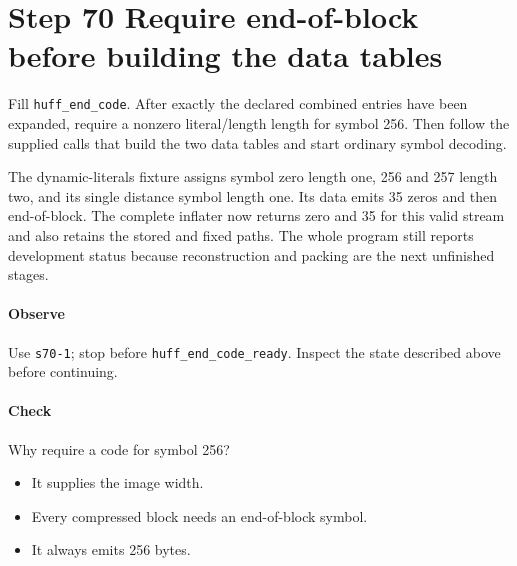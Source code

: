 \section{Step 70 Require end-of-block before building the data tables}\label{png-huff-s70}
Fill \texttt{huff\_end\_code}. After exactly the declared combined entries have been expanded, require a nonzero literal/length length for symbol 256. Then follow the supplied calls that build the two data tables and start ordinary symbol decoding.

The dynamic-literals fixture assigns symbol zero length one, 256 and 257 length two, and its single distance symbol length one. Its data emits 35 zeros and then end-of-block. The complete inflater now returns zero and 35 for this valid stream and also retains the stored and fixed paths. The whole program still reports development status because reconstruction and packing are the next unfinished stages.

\paragraph{Observe} Use \texttt{s70-1}; stop before \texttt{huff\_end\_code\_ready}. Inspect the state described above before continuing.

\paragraph{Check} Why require a code for symbol 256?
\begin{itemize}
\item[A.] It supplies the image width.
\item[B.] Every compressed block needs an end-of-block symbol.
\item[C.] It always emits 256 bytes.
\end{itemize}
